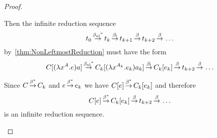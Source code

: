 \begin{theorem}
\begin{proof}
\begin{enumerate}
                Then the infinite reduction sequence
                $$
                t_0
                {{\,\stackrel{{{\beta_{\text{nl}}}}^*}{\to}\,}}
                t_k
                {\,\stackrel{{\beta_{\text{l}}}}{\to}\,}
                t_{k+1}
                {\,\stackrel{\beta}{\to}\,}
                t_{k+2}
                {\,\stackrel{\beta}{\to}\,}
                \ldots
                $$
                by~\ref{thm:NonLeftmostReduction}
                must have the form
                $$
                C[(\lambda x^{A}. e) a]
                {{\,\stackrel{{{\beta_{\text{nl}}}}^*}{\to}\,}}
                C_k[(\lambda x^{A_k}. e_k) a_k]
                {\,\stackrel{{\beta_{\text{l}}}}{\to}\,}
                C_k[e_k]
                {\,\stackrel{\beta}{\to}\,}
                t_{k+2}
                {\,\stackrel{\beta}{\to}\,}
                \ldots
                $$

                Since $C {\,\stackrel{\beta^*}{\to}\,} C_k$ and $e {\,\stackrel{\beta^*}{\to}\,} e_k$ we have $C[e]
                {\,\stackrel{\beta^*}{\to}\,} C_k[e_k]$ and therefore
                $$
                C[e] {\,\stackrel{\beta^*}{\to}\,} C_k[e_k] {\,\stackrel{\beta}{\to}\,} t_{k+2} {\,\stackrel{\beta}{\to}\,} \ldots
                $$
                is an infinite reduction sequence.
        \end{enumerate}
    \end{proof}
\end{theorem}

